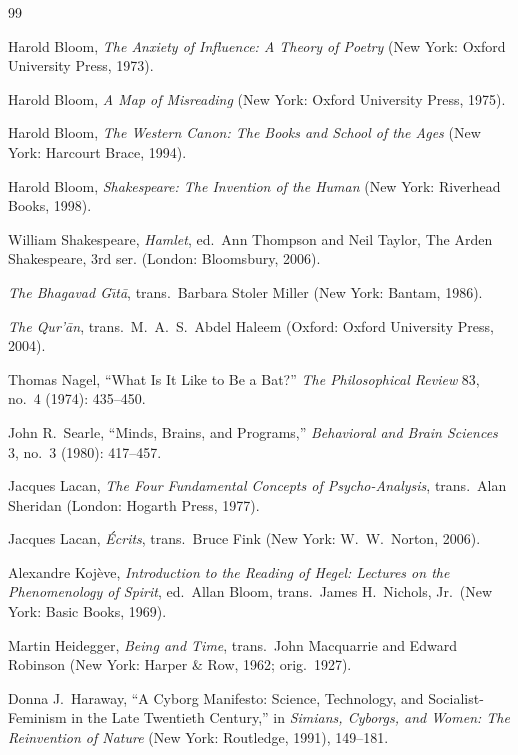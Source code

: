 \documentclass[11pt]{article}
\begin{document}
\begin{thebibliography}{99}

 Harold Bloom, \emph{The Anxiety of Influence: A Theory of Poetry} (New York: Oxford University Press, 1973).

 Harold Bloom, \emph{A Map of Misreading} (New York: Oxford University Press, 1975).

 Harold Bloom, \emph{The Western Canon: The Books and School of the Ages} (New York: Harcourt Brace, 1994).

 Harold Bloom, \emph{Shakespeare: The Invention of the Human} (New York: Riverhead Books, 1998).

 William Shakespeare, \emph{Hamlet}, ed.\ Ann Thompson and Neil Taylor, The Arden Shakespeare, 3rd ser. (London: Bloomsbury, 2006).

 \emph{The Bhagavad G\={\i}t\=a}, trans.\ Barbara Stoler Miller (New York: Bantam, 1986).

 \emph{The Qur'\=an}, trans.\ M.\ A.\ S.\ Abdel Haleem (Oxford: Oxford University Press, 2004).

 Thomas Nagel, ``What Is It Like to Be a Bat?'' \emph{The Philosophical Review} 83, no.\ 4 (1974): 435--450.

 John R.\ Searle, ``Minds, Brains, and Programs,'' \emph{Behavioral and Brain Sciences} 3, no.\ 3 (1980): 417--457.

 Jacques Lacan, \emph{The Four Fundamental Concepts of Psycho-Analysis}, trans.\ Alan Sheridan (London: Hogarth Press, 1977).

 Jacques Lacan, \emph{\'Ecrits}, trans.\ Bruce Fink (New York: W.\ W.\ Norton, 2006).

 Alexandre Koj\`eve, \emph{Introduction to the Reading of Hegel: Lectures on the Phenomenology of Spirit}, ed.\ Allan Bloom, trans.\ James H.\ Nichols, Jr.\ (New York: Basic Books, 1969).

 Martin Heidegger, \emph{Being and Time}, trans.\ John Macquarrie and Edward Robinson (New York: Harper \& Row, 1962; orig.\ 1927).

 Donna J.\ Haraway, ``A Cyborg Manifesto: Science, Technology, and Socialist-Feminism in the Late Twentieth Century,'' in \emph{Simians, Cyborgs, and Women: The Reinvention of Nature} (New York: Routledge, 1991), 149--181.


\end{thebibliography}
\end{document}
